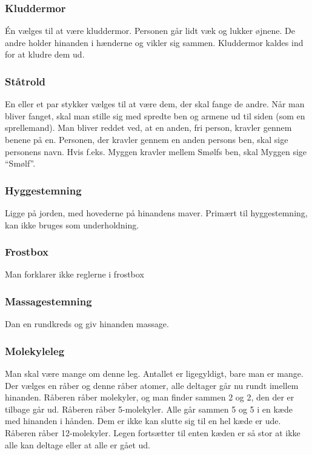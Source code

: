\begin{multicols}{2}
\subsubsection*{Kluddermor}
Én vælges til at være kluddermor. Personen går lidt væk og lukker øjnene. De andre holder hinanden i hænderne og vikler sig sammen. Kluddermor kaldes ind for at kludre dem ud.

\subsubsection*{Ståtrold}
En eller et par stykker vælges til at være dem, der skal fange de andre. Når man bliver fanget, skal man stille sig med spredte ben og armene ud til siden (som en sprellemand). Man bliver reddet ved, at en anden, fri person, kravler gennem benene på en. Personen, der kravler gennem en anden persons ben, skal sige personens navn. Hvis f.eks. Myggen kravler mellem Smølfs ben, skal Myggen sige “Smølf”.

\subsubsection*{Hyggestemning}
Ligge på jorden, med hovederne på hinandens maver. Primært til hyggestemning, kan ikke bruges som underholdning.

\subsubsection*{Frostbox}
Man forklarer ikke reglerne i frostbox


\subsubsection*{Massagestemning}
Dan en rundkreds og giv hinanden massage.


\subsubsection*{Molekyleleg}
Man skal være mange om denne leg. Antallet er ligegyldigt, bare man er mange. Der vælges en råber og denne råber atomer, alle deltager går nu rundt imellem hinanden. Råberen råber molekyler, og man finder sammen 2 og 2, den der er tilbage går ud. Råberen råber 5-molekyler. Alle går sammen 5 og 5 i en kæde med hinanden i hånden. Dem er ikke kan slutte sig til en hel kæde er ude. Råberen råber 12-molekyler. Legen fortsætter til enten kæden er så stor at ikke alle kan deltage eller at alle er gået ud. 
    

\end{multicols}
